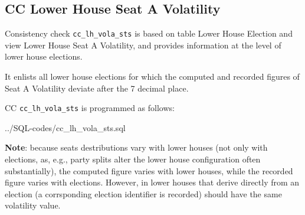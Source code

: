 \subsection{CC Lower House Seat A Volatility}\label{cc_lh_vola_sts}
Consistency check \texttt{\footnotesize cc\_lh\_vola\_sts} is based on table Lower House Election and view Lower House Seat A Volatility, and provides information at the level of lower house elections.

It enlists all lower house elections for which the computed and recorded figures of Seat A Volatility deviate after the 7 decimal place.

CC \texttt{\footnotesize cc\_lh\_vola\_sts} is programmed as follows:

%
{../SQL-codes/cc_lh_vola_sts.sql}

{\bf Note}: because seats destributions vary with lower houses (not only with elections, as, e.g., party splits alter the lower house configuration often substantially), the computed figure varies with lower houses, while the recorded figure varies with elections. However, in lower houses that derive directly from an election (a corrsponding election identifier is recorded) should have the same volatility value.

